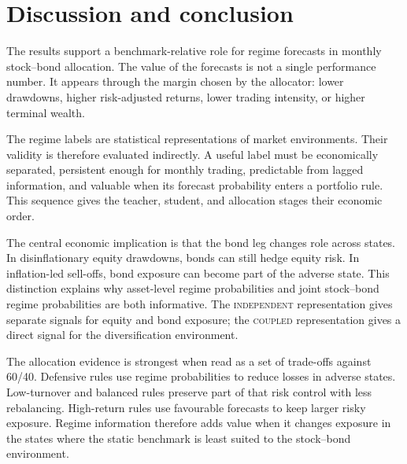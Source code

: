﻿\documentclass[10pt]{article}
\newcommand{\Acoup}{\textsc{coupled}}
\newcommand{\Bindep}{\textsc{independent}}
\begin{document}
\section{Discussion and conclusion}
\label{sec:conclusion}

The results support a benchmark-relative role for regime forecasts in monthly stock--bond
allocation. The value of the forecasts is not a single performance number. It appears through
the margin chosen by the allocator: lower drawdowns, higher risk-adjusted returns, lower
trading intensity, or higher terminal wealth.

The regime labels are statistical representations of market environments. Their validity is
therefore evaluated indirectly. A useful label must be economically separated, persistent
enough for monthly trading, predictable from lagged information, and valuable when its
forecast probability enters a portfolio rule. This sequence gives the teacher, student, and
allocation stages their economic order.

The central economic implication is that the bond leg changes role across states. In
disinflationary equity drawdowns, bonds can still hedge equity risk. In inflation-led
sell-offs, bond exposure can become part of the adverse state. This distinction explains why
asset-level regime probabilities and joint stock--bond regime probabilities are both
informative. The \Bindep{} representation gives separate signals for equity and bond
exposure; the \Acoup{} representation gives a direct signal for the diversification
environment.

The allocation evidence is strongest when read as a set of trade-offs against 60/40.
Defensive rules use regime probabilities to reduce losses in adverse states. Low-turnover
and balanced rules preserve part of that risk control with less rebalancing. High-return
rules use favourable forecasts to keep larger risky exposure. Regime information therefore
adds value when it changes exposure in the states where the static benchmark is least suited
to the stock--bond environment.
\appendix
\renewcommand{\thefigure}{\thesection.\arabic{figure}}
\renewcommand{\thetable}{\thesection.\arabic{table}}


\end{document}
